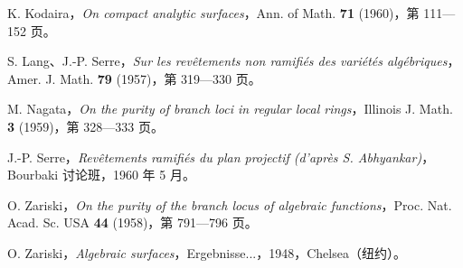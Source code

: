 \begin{enumerate}[label={[\arabic*]},leftmargin=2.2em]
\item K. Kodaira，\textit{On compact analytic surfaces}，Ann. of Math. \textbf{71} (1960)，第 111—152 页。
\item S. Lang、J.-P. Serre，\textit{Sur les revêtements non ramifiés des variétés algébriques}，Amer. J. Math. \textbf{79} (1957)，第 319—330 页。
\item M. Nagata，\textit{On the purity of branch loci in regular local rings}，Illinois J. Math. \textbf{3} (1959)，第 328—333 页。
\item J.-P. Serre，\textit{Revêtements ramifiés du plan projectif (d’après S. Abhyankar)}，Bourbaki 讨论班，1960 年 5 月。
\end{enumerate}
\begin{enumerate}[label={[\arabic*]},leftmargin=2.2em,start=5]
\item O. Zariski，\textit{On the purity of the branch locus of algebraic functions}，Proc. Nat. Acad. Sc. USA \textbf{44} (1958)，第 791—796 页。
\item O. Zariski，\textit{Algebraic surfaces}，Ergebnisse...，1948，Chelsea（纽约）。
\end{enumerate}
